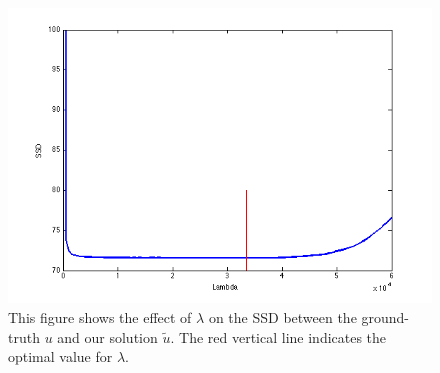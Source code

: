 \documentclass{paper}
\begin{document}
\begin{enumerate}
\begin{figure}[]
\begin{center}
         \includegraphics[width=\textwidth]{SSD}       
\end{center}
\caption{This figure shows the effect of $\lambda$ on the SSD between the ground-truth $u$ and our solution $\tilde{u}$. The red vertical line indicates the optimal value for $\lambda$.  }
\label{fig:SSD}
\end{figure}

\end{enumerate}


 
\end{document}

